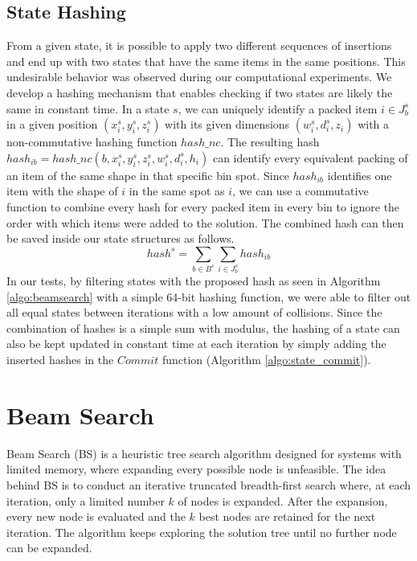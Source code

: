 \subsection{State Hashing}
\label{sec:state_uniqueness}%
From a given state, it is possible to apply two different sequences of insertions and end up with two states that have the same items in the same positions.
This undesirable behavior was observed during our computational experiments.
We develop a hashing mechanism that enables checking if two states are likely the same in constant time.
In a state $s$, we can uniquely identify a packed item $i \in J^s_b$ in a given position $(x^s_i, y^s_i, z^s_i)$ with its given dimensions $(w^s_i, d^s_i, z_i)$ with a non-commutative hashing function $hash\_nc$. The resulting hash $hash_{ib} = hash\_nc(b, x^s_i, y^s_i, z^s_i, w^s_i, d^s_i, h_i)$ can identify every equivalent packing of an item of the same shape in that specific bin spot.
Since $hash_{ib}$ identifies one item with the shape of $i$ in the same spot as $i$, we can use a commutative function to combine every hash for every packed item in every bin to ignore the order with which items were added to the solution.
The combined hash can then be saved inside our state structures as follows.
\begin{equation}
    hash^s = \sum\limits_{b \in B^s}{\sum\limits_{i \in J^s_b}{hash_{ib}}}
\end{equation}
In our tests, by filtering states with the proposed hash as seen in Algorithm \ref{algo:beamsearch} with a simple 64-bit hashing function, we were able to filter out all equal states between iterations with a low amount of collisions.
Since the combination of hashes is a simple sum with modulus, the hashing of a state can also be kept updated in constant time at each iteration by simply adding the inserted hashes in the $Commit$ function (Algorithm \ref{algo:state_commit}).

\section{Beam Search}
\label{sec:beamsearch}%
Beam Search (BS) is a heuristic tree search algorithm designed for systems with limited memory, where expanding every possible node is unfeasible.
The idea behind BS is to conduct an iterative truncated breadth-first search where, at each iteration, only a limited number $k$ of nodes is expanded.
After the expansion, every new node is evaluated and the $k$ best nodes are retained for the next iteration. The algorithm keeps exploring the solution tree until no further node can be expanded.

